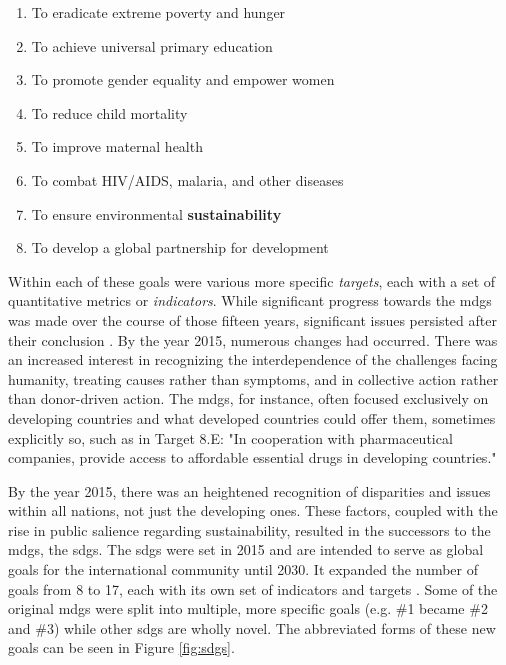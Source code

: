 \begin{enumerate} \setlength{\itemsep}{0pt} \setlength{\parskip}{0pt}
	\item To eradicate extreme poverty and hunger
	\item To achieve universal primary education
	\item To promote gender equality and empower women
	\item To reduce child mortality
	\item To improve maternal health
	\item To combat HIV/AIDS, malaria, and other diseases
	\item To ensure environmental \textbf{sustainability}
	\item To develop a global partnership for development
\end{enumerate}
    

Within each of these goals were various more specific \textit{targets}, each with a set of quantitative metrics or \textit{indicators}. While significant progress towards the \acp{mdg} was made over the course of those fifteen years, significant issues persisted after their conclusion \cite{inter-agencyandexpertgrouponmdgindicatorsMillenniumDevelopmentGoals2015}. By the year 2015, numerous changes had occurred. There was an increased interest in recognizing the interdependence of the challenges facing humanity, treating causes rather than symptoms, and in collective action rather than donor-driven action. The \acp{mdg}, for instance, often focused exclusively on developing countries and what developed countries could offer them, sometimes explicitly so, such as in Target 8.E: "In cooperation with pharmaceutical companies, provide access to affordable essential drugs in developing countries." 

By the year 2015, there was an heightened recognition of disparities and issues within all nations, not just the developing ones. These factors, coupled with the rise in public salience regarding sustainability, resulted in the successors to the \acp{mdg}, the \acp{sdg}. The \acp{sdg} were set in 2015 and are intended to serve as global goals for the international community until 2030. It expanded the number of goals from 8 to 17, each with its own set of indicators and targets \cite{unitednationsTransformingOurWorld2015}. Some of the original \acp{mdg} were split into multiple, more specific goals (e.g. \#1 became \#2 and \#3) while other \acp{sdg} are wholly novel. The abbreviated forms of these new goals can be seen in Figure \ref{fig:sdgs}.

